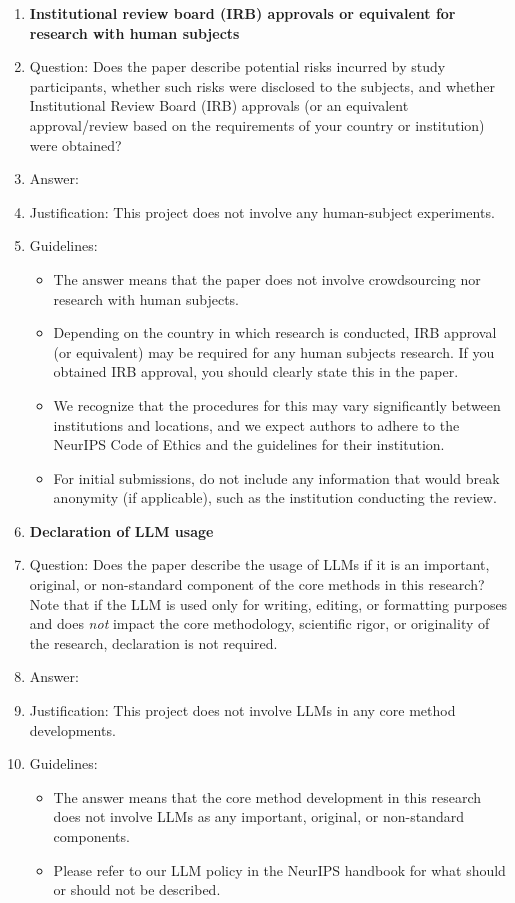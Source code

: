 \documentclass{article}
\begin{document}
\begin{enumerate}
\item {\bf Institutional review board (IRB) approvals or equivalent for research with human subjects}
    \item[] Question: Does the paper describe potential risks incurred by study participants, whether such risks were disclosed to the subjects, and whether Institutional Review Board (IRB) approvals (or an equivalent approval/review based on the requirements of your country or institution) were obtained?
    \item[] Answer: \answerNA{} %
    \item[] Justification: This project does not involve any human-subject experiments.
    \item[] Guidelines:
    \begin{itemize}
        \item The answer \answerNA{} means that the paper does not involve crowdsourcing nor research with human subjects.
        \item Depending on the country in which research is conducted, IRB approval (or equivalent) may be required for any human subjects research. If you obtained IRB approval, you should clearly state this in the paper. 
        \item We recognize that the procedures for this may vary significantly between institutions and locations, and we expect authors to adhere to the NeurIPS Code of Ethics and the guidelines for their institution. 
        \item For initial submissions, do not include any information that would break anonymity (if applicable), such as the institution conducting the review.
    \end{itemize}

\item {\bf Declaration of LLM usage}
    \item[] Question: Does the paper describe the usage of LLMs if it is an important, original, or non-standard component of the core methods in this research? Note that if the LLM is used only for writing, editing, or formatting purposes and does \emph{not} impact the core methodology, scientific rigor, or originality of the research, declaration is not required.
    \item[] Answer: \answerNA{} %
    \item[] Justification: This project does not involve LLMs in any core method developments.
    \item[] Guidelines:
    \begin{itemize}
        \item The answer \answerNA{} means that the core method development in this research does not involve LLMs as any important, original, or non-standard components.
        \item Please refer to our LLM policy in the NeurIPS handbook for what should or should not be described.
    \end{itemize}

\end{enumerate}
\end{document}
